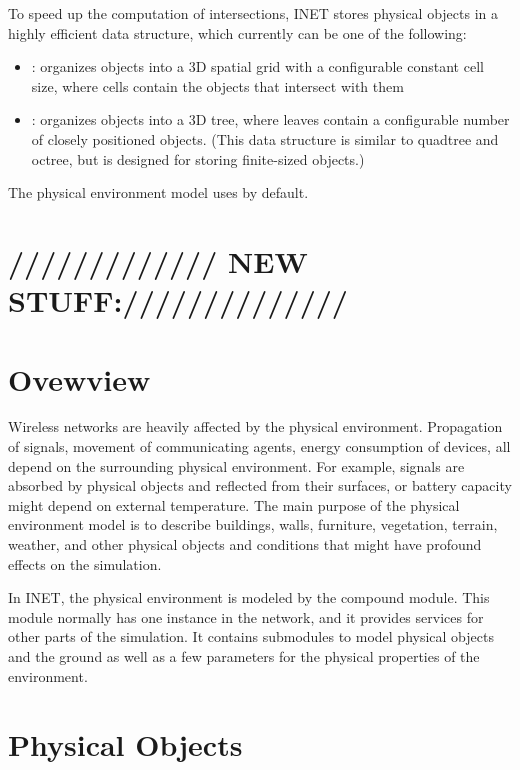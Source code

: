 To speed up the computation of intersections, INET stores physical objects
in a highly efficient data structure, which currently can be one of the
following:

\begin{itemize}
  \item {}: organizes objects into a 3D spatial grid with
    a configurable constant cell size, where cells contain the objects that
    intersect with them
  \item {}: organizes objects into a 3D tree, where
    leaves contain a configurable number of closely positioned objects.
    (This data structure is similar to quadtree and octree, but is designed for
    storing finite-sized objects.)
\end{itemize}

The physical environment model uses  by default.


\section{///////////// NEW STUFF://////////////}

\section{Ovewview}

Wireless networks are heavily affected by the physical environment.
Propagation of signals, movement of communicating agents, energy
consumption of devices, all depend on the surrounding physical environment.
For example, signals are absorbed by physical objects and reflected from
their surfaces, or battery capacity might depend on external temperature.
The main purpose of the physical environment model is to describe
buildings, walls, furniture, vegetation, terrain, weather, and other
physical objects and conditions that might have profound effects on the
simulation.

In INET, the physical environment is modeled by the
 compound module. This module normally has one
instance in the network, and it provides services for other parts of the
simulation. It contains submodules to model physical objects and the ground
as well as a few parameters for the physical properties of the environment.

\section{Physical Objects}

